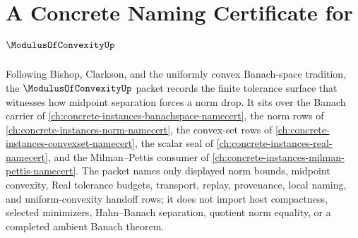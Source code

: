 \chapter{A Concrete Naming Certificate for $\ModulusOfConvexityUp$}
\label{ch:concrete-instances-modulus-of-convexity-namecert}

Following Bishop, Clarkson, and the uniformly convex Banach-space tradition, the $\ModulusOfConvexityUp$ packet records the finite tolerance surface that witnesses how midpoint separation forces a norm drop. It sits over the Banach carrier of \autoref{ch:concrete-instances-banachspace-namecert}, the norm rows of \autoref{ch:concrete-instances-norm-namecert}, the convex-set rows of \autoref{ch:concrete-instances-convexset-namecert}, the scalar seal of \autoref{ch:concrete-instances-real-namecert}, and the Milman--Pettis consumer of \autoref{ch:concrete-instances-milman-pettis-namecert}. The packet names only displayed norm bounds, midpoint convexity, Real tolerance budgets, transport, replay, provenance, local naming, and uniform-convexity handoff rows; it does not import host compactness, selected minimizers, Hahn--Banach separation, quotient norm equality, or a completed ambient Banach theorem.

